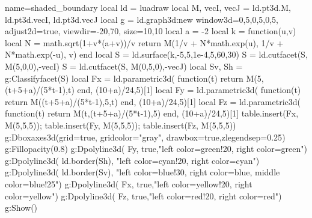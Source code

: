 \documentclass{standalone}
\begin{document}
\begin{luadraw}{name=shaded_boundary}
local ld = luadraw
local M, vecI, vecJ = ld.pt3d.M, ld.pt3d.vecI, ld.pt3d.vecJ
local g = ld.graph3d:new{ window3d={0,5,0,5,0,5}, adjust2d=true, viewdir={-20,70}, size={10,10} }
local a = -2
local k = function(u,v)
    local N = math.sqrt(1+v*(a+v))/v
    return M(1/v + N*math.exp(u), 1/v + N*math.exp(-u), v)
end
local S = ld.surface(k,-5,5,1e-4,5,{60,30})
S = ld.cutfacet(S, {M(5,0,0),-vecI})
S = ld.cutfacet(S, {M(0,5,0),-vecJ})
local Sv, Sh = g:Classifyfacet(S)
local Fx = ld.parametric3d( function(t) return M(5,(t+5+a)/(5*t-1),t) end, (10+a)/24,5)[1]
local Fy = ld.parametric3d( function(t) return M((t+5+a)/(5*t-1),5,t) end, (10+a)/24,5)[1]
local Fz = ld.parametric3d( function(t) return M(t,(t+5+a)/(5*t-1),5) end, (10+a)/24,5)[1]
table.insert(Fx, M(5,5,5)); table.insert(Fy, M(5,5,5)); table.insert(Fz, M(5,5,5))
g:Dboxaxes3d({grid=true, gridcolor="gray", drawbox=true,zlegendsep=0.25})
g:Fillopacity(0.8)
g:Dpolyline3d( Fy, true,"left color=green!20, right color=green")
g:Dpolyline3d( ld.border(Sh), "left color=cyan!20, right color=cyan")
g:Dpolyline3d( ld.border(Sv), "left color=blue!30, right color=blue, middle color=blue!25")
g:Dpolyline3d( Fx, true,"left color=yellow!20, right color=yellow")
g:Dpolyline3d( Fz, true,"left color=red!20, right color=red")
g:Show()
\end{luadraw}
\end{document}
